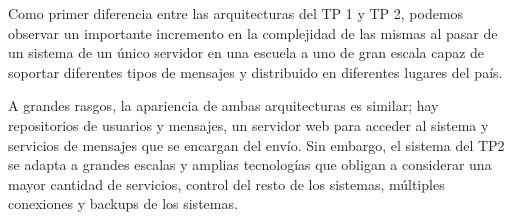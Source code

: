 \documentclass[a4paper, 10pt, twoside]{article}
\begin{document}
Como primer diferencia entre las arquitecturas del TP 1 y TP 2, podemos observar un importante incremento en la complejidad de las mismas al pasar de un sistema de un único servidor en una escuela a uno de gran escala capaz de soportar diferentes tipos de mensajes y distribuido en diferentes lugares del país.

A grandes rasgos, la apariencia de ambas arquitecturas es similar; hay repositorios de usuarios y mensajes, un servidor web para acceder al sistema y servicios de mensajes que se encargan del envío. Sin embargo, el sistema del TP2 se adapta a grandes escalas y amplias tecnologías que obligan a considerar una mayor cantidad de servicios, control del resto de los sistemas, múltiples conexiones y backups de los sistemas.

\end{document}
